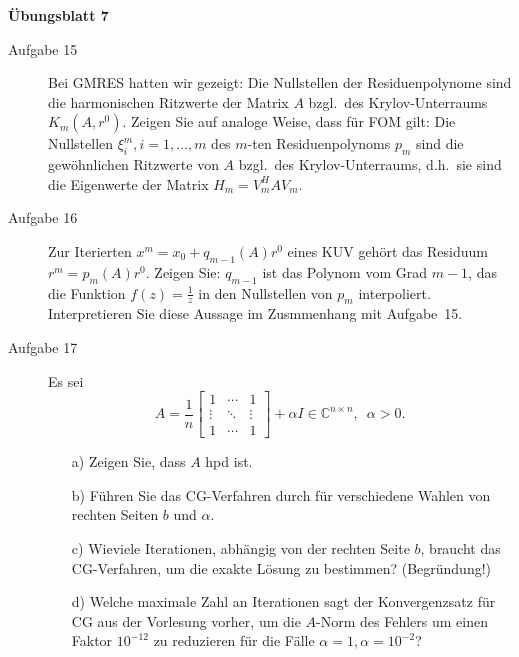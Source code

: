 \documentclass[a4paper,11pt]{scrartcl}
\begin{document}
\aihead

\begin{center}
  {\large\textbf{Übungsblatt 7}}
\end{center}


\begin{description}
\item[Aufgabe 15] Bei GMRES hatten wir gezeigt: Die Nullstellen der Residuenpolynome sind die harmonischen Ritzwerte der Matrix $A$  bzgl.\ des Krylov-Unterraums $K_m(A,r^0)$. Zeigen Sie auf analoge Weise, dass für FOM gilt: Die Nullstellen $\xi_i^m, i=1,\ldots,m$ des $m$-ten Residuenpolynoms $p_m$ sind die gewöhnlichen Ritzwerte von $A$ bzgl.\ des Krylov-Unterraums, d.h.\ sie sind die Eigenwerte der Matrix $H_m = V_m^HAV_m$.
 \medskip
 
\item[Aufgabe 16] Zur Iterierten $x^m = x_0 + q_{m-1}(A)r^0$ eines KUV gehört das Residuum $r^m = p_m(A)r^0$. Zeigen Sie: $q_{m-1}$ ist das Polynom vom Grad $m-1$, das die Funktion $f(z) = \frac{1}{z}$ in den Nullstellen von $p_m$ interpoliert. Interpretieren Sie diese Aussage im Zusmmenhang mit Aufgabe~15.
 \medskip

 \item[Aufgabe 17] Es sei
 \[
 A = \frac{1}{n} \begin{bmatrix} 1 & \cdots & 1 \\
 \vdots & \ddots & \vdots \\
   1 & \cdots & 1
   \end{bmatrix} + \alpha I \in \mathbb{C}^{n \times n}, \enspace \alpha > 0.
   \]
 \begin{itemize}
 \item[a)] Zeigen Sie, dass $A$ hpd ist.
 \item[b)] Führen Sie das CG-Verfahren durch für verschiedene Wahlen von rechten Seiten $b$ und $\alpha$.
 \item[c)] Wieviele Iterationen, abhängig von der rechten Seite $b$,  braucht das CG-Verfahren, um die exakte Lösung zu bestimmen?  (Begründung!)
 \item[d)] Welche maximale Zahl an Iterationen sagt der Konvergenzsatz für CG aus der Vorlesung vorher, um die $A$-Norm des Fehlers um einen Faktor $10^{-12}$ zu reduzieren für die Fälle $\alpha = 1, \alpha = 10^{-2}$?
 \end{itemize}
 
\end{description}
\end{document}
